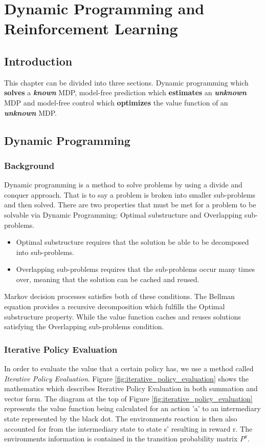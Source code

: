 \graphicspath{{RL/fig}}
\chapter{Dynamic Programming and Reinforcement Learning}
\label{chap:RL}

\section{Introduction}
This chapter can be divided into three sections. Dynamic programming which \textbf{solves} a \textit{\textbf{known}} MDP, model-free prediction which \textbf{estimates} an \textit{\textbf{unknown}} MDP and model-free control which \textbf{optimizes} the value function of an \textit{\textbf{unknown}} MDP.

\section{Dynamic Programming}
\subsection{Background}
Dynamic programming is a method to solve problems by using a divide and conquer approach. That is to say a problem is broken into smaller sub-problems and then solved.
There are two properties that must be met for a problem to be solvable via Dynamic Programming: Optimal substructure and Overlapping sub-problems. \cite{David_Silver}
\begin{itemize}
	\item Optimal substructure requires that the solution be able to be decomposed into sub-problems.
	\item Overlapping sub-problems requires that the sub-problems occur many times over, meaning that the solution can be cached and reused.
\end{itemize}

Markov decision processes satisfies both of these conditions. The Bellman equation provides a recursive decomposition which fulfills the Optimal substructure property. While the value function caches and reuses solutions satisfying the Overlapping sub-problems condition. \cite{David_Silver}\\

\subsection{Iterative Policy Evaluation}
In order to evaluate the value that a certain policy has, we use a method called \textit{Iterative Policy Evaluation}. Figure \ref{fig:iterative_policy_evaluation} shows the mathematics which describes Iterative Policy Evaluation in both summation and vector form. The diagram at the top of Figure \ref{fig:iterative_policy_evaluation} represents the value function being calculated for an action 'a' to an intermediary state represented by the black dot. The environments reaction is then also accounted for from the intermediary state to state s' resulting in reward r. The environments information is contained in the transition probability matrix $P^\pi$.

